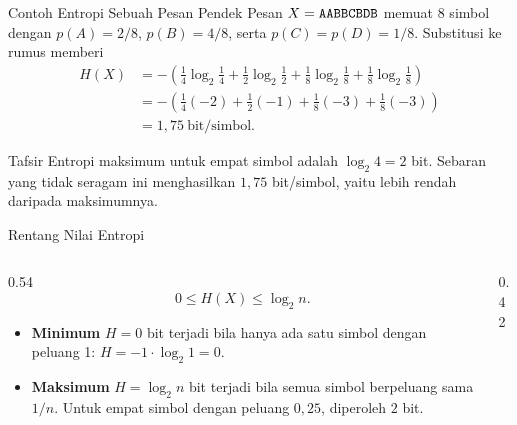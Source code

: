 \documentclass[aspectratio=169,11pt]{beamer}
\begin{document}
\begin{frame}{Contoh Entropi Sebuah Pesan Pendek}
    \footnotesize
    Pesan $X = \texttt{AABBCBDB}$ memuat 8 simbol dengan $p(A) = 2/8$,
    $p(B) = 4/8$, serta $p(C) = p(D) = 1/8$. Substitusi ke rumus memberi
    \[
    \begin{aligned}
        H(X) &= -\left(\tfrac14 \log_2 \tfrac14 + \tfrac12 \log_2 \tfrac12
                 + \tfrac18 \log_2 \tfrac18 + \tfrac18 \log_2 \tfrac18\right)\\
             &= -\left(\tfrac14(-2) + \tfrac12(-1) + \tfrac18(-3)
                 + \tfrac18(-3)\right)\\
             &= 1{,}75\ \text{bit/simbol}.
    \end{aligned}
    \]
    \begin{exampleblock}{Tafsir}
        Entropi maksimum untuk empat simbol adalah $\log_2 4 = 2$ bit.
        Sebaran yang tidak seragam ini menghasilkan $1{,}75$ bit/simbol,
        yaitu lebih rendah daripada maksimumnya.
    \end{exampleblock}
\end{frame}

\begin{frame}{Rentang Nilai Entropi}
    \begin{columns}[T,onlytextwidth]
        \begin{column}{0.54\textwidth}
            \[ 0 \le H(X) \le \log_2 n. \]
            \begin{itemize}
                \item \textbf{Minimum} $H = 0$ bit terjadi bila hanya ada satu
                      simbol dengan peluang 1: $H = -1 \cdot \log_2 1 = 0$.
                \item \textbf{Maksimum} $H = \log_2 n$ bit terjadi bila semua
                      simbol berpeluang sama $1/n$. Untuk empat simbol dengan
                      peluang $0{,}25$, diperoleh $2$ bit.
            \end{itemize}
        \end{column}
        \begin{column}{0.42\textwidth}
            \centering
        \end{column}
    \end{columns}
\end{frame}
\end{document}
